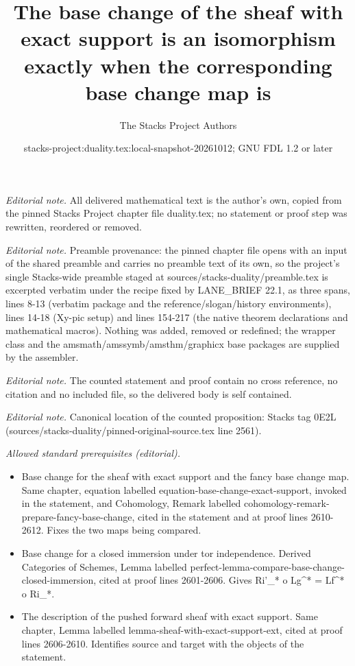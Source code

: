 \documentclass[10pt,a4paper]{amsart}
\title{The base change of the sheaf with exact support is an isomorphism exactly when the corresponding base change map is}
\author{The Stacks Project Authors}
\date{stacks-project:duality.tex:local-snapshot-20261012; GNU FDL 1.2 or later}
\theoremstyle{plain}
\theoremstyle{definition}
\theoremstyle{remark}
\numberwithin{equation}{subsection}
\begin{document}
\maketitle
\noindent\textit{Editorial note.} All delivered mathematical text is the author's own, copied from the pinned Stacks Project chapter file duality.tex; no statement or proof step was rewritten, reordered or removed.\par\medskip
\noindent\textit{Editorial note.} Preamble provenance: the pinned chapter file opens with an input of the shared preamble and carries no preamble text of its own, so the project's single Stacks-wide preamble staged at sources/stacks-duality/preamble.tex is excerpted verbatim under the recipe fixed by LANE\_BRIEF 22.1, as three spans, lines 8-13 (verbatim package and the reference/slogan/history environments), lines 14-18 (Xy-pic setup) and lines 154-217 (the native theorem declarations and mathematical macros). Nothing was added, removed or redefined; the wrapper class and the amsmath/amssymb/amsthm/graphicx base packages are supplied by the assembler.\par\medskip
\noindent\textit{Editorial note.} The counted statement and proof contain no cross reference, no citation and no included file, so the delivered body is self contained.\par\medskip
\noindent\textit{Editorial note.} Canonical location of the counted proposition: Stacks tag 0E2L (sources/stacks-duality/pinned-original-source.tex line 2561).\par\medskip
\noindent\textit{Allowed standard prerequisites (editorial).}\begin{itemize}
\item Base change for the sheaf with exact support and the fancy base change map. Same chapter, equation labelled equation-base-change-exact-support, invoked in the statement, and Cohomology, Remark labelled cohomology-remark-prepare-fancy-base-change, cited in the statement and at proof lines 2610-2612. Fixes the two maps being compared.
\item Base change for a closed immersion under tor independence. Derived Categories of Schemes, Lemma labelled perfect-lemma-compare-base-change-closed-immersion, cited at proof lines 2601-2606. Gives Ri'\_* o Lg\textasciicircum{}* = Lf\textasciicircum{}* o Ri\_*.
\item The description of the pushed forward sheaf with exact support. Same chapter, Lemma labelled lemma-sheaf-with-exact-support-ext, cited at proof lines 2606-2610. Identifies source and target with the objects of the statement.
\end{itemize}\medskip
\end{document}
